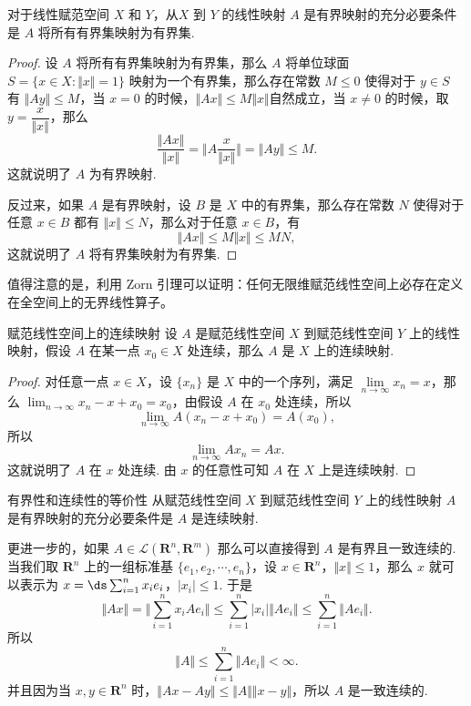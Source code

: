 \begin{theorem}{}{}
    对于线性赋范空间 $X$ 和 $Y$，从$X$ 到 $Y$ 的线性映射 $A$ 是有界映射的充分必要条件是 $A$ 将所有有界集映射为有界集.
\end{theorem}

\begin{proof}
    设 $A$ 将所有有界集映射为有界集，那么 $A$ 将单位球面 $S=\{x\in X \colon \Vert x\Vert=1\}$ 映射为一个有界集，那么存在常数 $M\leqslant 0$ 使得对于 $y\in S$ 有 $\Vert Ay\Vert\leqslant M$，当 $x = 0$ 的时候，$\Vert Ax\Vert \leqslant M\Vert x\Vert$自然成立，当 $x \neq 0$ 的时候，取 $y=\dfrac{x}{\Vert x\Vert}$，那么 \[\frac{\Vert Ax\Vert}{\Vert x\Vert} = \Vert A\frac{x}{\Vert x\Vert}\Vert = \Vert Ay\Vert \leqslant M.\] 这就说明了 $A$ 为有界映射.

    反过来，如果 $A$ 是有界映射，设 $B$ 是 $X$ 中的有界集，那么存在常数 $N$ 使得对于任意 $x\in B$ 都有 $\Vert x\Vert\leqslant N$，那么对于任意 $x\in B$，有 \[\Vert Ax\Vert\leqslant M\Vert x\Vert\leqslant MN,\]这就说明了 $A$ 将有界集映射为有界集.
\end{proof}

值得注意的是，利用 Zorn 引理可以证明：任何无限维赋范线性空间上必存在定义在全空间上的无界线性算子。

\begin{theorem}{赋范线性空间上的连续映射}{}
    设 $A$ 是赋范线性空间 $X$ 到赋范线性空间 $Y$ 上的线性映射，假设 $A$ 在某一点 $x_0\in X$ 处连续，那么 $A$ 是 $X$ 上的连续映射.
\end{theorem}

\begin{proof}
    对任意一点 $x\in X$，设 $\{x_n\}$ 是 $X$ 中的一个序列，满足 $\lim\limits_{n\to\infty}x_n = x$，那么 $\lim_{n\to\infty}x_n - x + x_0 = x_0$，由假设 $A$ 在 $x_0$ 处连续，所以 \[\lim\limits_{n\to\infty}A(x_n - x + x_0) = A(x_0),\]
    所以 \[\lim\limits_{n\to\infty}Ax_n = Ax.\]
    这就说明了 $A$ 在 $x$ 处连续. 由 $x$ 的任意性可知 $A$ 在 $X$ 上是连续映射.
\end{proof}

\begin{theorem}{有界性和连续性的等价性}{}
    从赋范线性空间 $X$ 到赋范线性空间 $Y$ 上的线性映射 $A$ 是有界映射的充分必要条件是 $A$ 是连续映射.
\end{theorem}

更进一步的，如果 $A\in \mathcal{L}(\mathbf{R}^n, \mathbf{R}^m)$ 那么可以直接得到 $A$ 是有界且一致连续的. 当我们取 $\mathbf{R}^n$ 上的一组标准基 $\{e_1, e_2, \cdots, e_n\}$，设 $x\in \mathbf{R}^n$，$\Vert x\Vert \leqslant 1$，那么 $x$ 就可以表示为 $x = \ds\sum_{i=1}^{n} x_ie_i$，$\vert x_i \vert \leqslant 1$. 于是
\[\Vert Ax\Vert = \Vert \sum_{i=1}^{n} x_iAe_i\Vert \leqslant \sum_{i=1}^{n}\vert x_i\vert \Vert Ae_i\Vert \leqslant \sum_{i=1}^{n}\Vert Ae_i\Vert.\]
所以\[\Vert A\Vert \leqslant \sum_{i=1}^{n}\Vert Ae_i\Vert < \infty.\]
并且因为当 $x, y\in \mathbf{R}^n$ 时，$\Vert Ax - Ay \Vert \leqslant \Vert A\Vert\Vert x-y\Vert$，所以 $A$ 是一致连续的.


